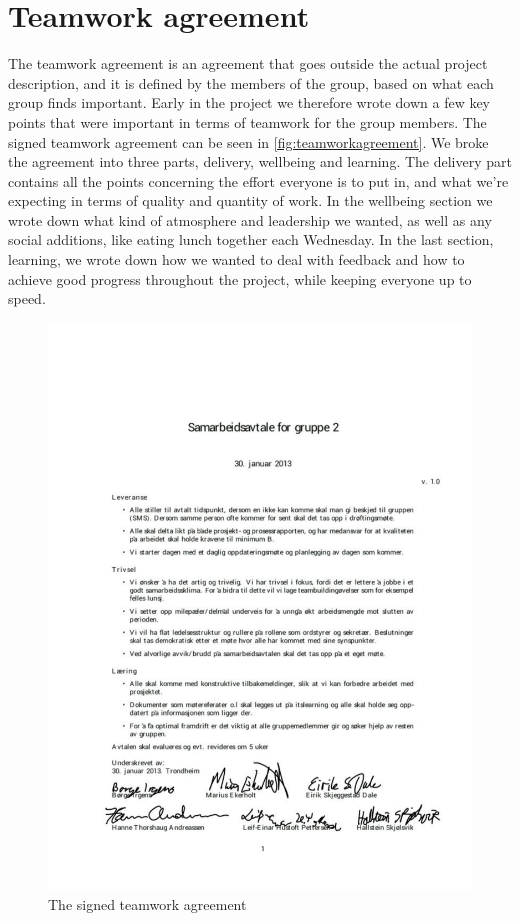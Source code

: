 \section{Teamwork agreement}
The teamwork agreement is an agreement that goes outside the actual project description, and it is defined by the members of the group, based on what each group finds important. Early in the project we therefore wrote down a few key points that were important in terms of teamwork for the group members. The signed teamwork agreement can be seen in \autoref{fig:teamworkagreement}. We broke the agreement into three parts, delivery, wellbeing and learning. The delivery part contains all the points concerning the effort everyone is to put in, and what we're expecting in terms of quality and quantity of work. In the wellbeing section we wrote down what kind of atmosphere and leadership we wanted, as well as any social additions, like eating lunch together each Wednesday. In the last section, learning, we wrote down how we wanted to deal with feedback and how to achieve good progress throughout the project, while keeping everyone up to speed.

\begin{figure}
	\begin{center}
		\includegraphics[width=1.0\textwidth]{Figures/teamworkagreement.pdf}
	\end{center}
	\caption[Teamwork agreement]{The signed teamwork agreement}
	\label{fig:teamworkagreement}
\end{figure}